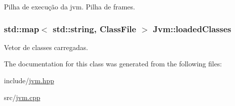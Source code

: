 Pilha de execução da jvm. Pilha de frames. 

\hypertarget{classJvm_ac74fb0e170f232ddc32244a1ce7746b7}{
\subsubsection[{loaded\+Classes}]{\setlength{\rightskip}{0pt plus 5cm}std\+::map$<$ std\+::string, {\bf Class\+File} $>$ Jvm\+::loaded\+Classes}}\label{classJvm_ac74fb0e170f232ddc32244a1ce7746b7}


Vetor de classes carregadas. 



The documentation for this class was generated from the following files\+:\begin{DoxyCompactItemize}
\item 
include/\hyperlink{jvm_8hpp}{jvm.\+hpp}\item 
src/\hyperlink{jvm_8cpp}{jvm.\+cpp}\end{DoxyCompactItemize}
